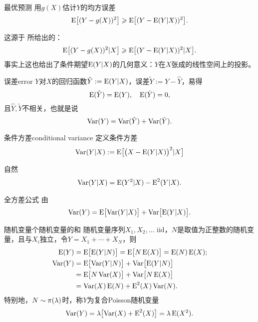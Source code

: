\begin{theorem}{最优预测}{}
	用$g(X)$估计$Y$的均方误差
	\begin{align}
		\E\bigfkh{(Y-g(X))^2}\geqslant\E\bigfkh{(Y-\E(Y|X))^2}.
	\end{align}
\end{theorem}
这源于 所给出的：
\[
	\E\bigfkh{(Y-g(X))^2|X}\geqslant\E\bigfkh{(Y-\E(Y|X))^2|X}.
\]
事实上这也给出了条件期望$\E(Y|X)$的几何意义：$Y$在$X$张成的线性空间上的投影。
\begin{example}{误差}{error}
	$Y$对$X$的回归函数$\hat Y:=\E(Y|X)$，误差$\tilde Y:=Y-\hat Y$，易得
	\[
		\E(\hat Y)=\E(Y),\quad\E(\tilde Y)=0,
	\]
	且$\hat Y,\tilde Y$不相关，也就是说
	\[
		\Var(Y)=\Var(\hat Y)+\Var(\tilde Y).
	\]
	\begin{center}
	\end{center}
\end{example}
\begin{definition}{条件方差}{conditional variance}
	定义条件方差
	\begin{align}
		\Var(Y|X):=\E\bigfkh{\bigkh{X-\E(Y|X)}^2|X}
	\end{align}
\end{definition}
自然
\begin{align}
	\Var(Y|X)=\E(Y^2|X)-\E^2(Y|X).
\end{align}
\begin{theorem}{全方差公式}{}
	由
	\begin{align}
		\Var(Y)=\E\bigfkh{\Var(Y|X)}+\Var\bigfkh{\E(Y|X)}.
	\end{align}
\end{theorem}
\begin{example}{随机变量个随机变量的和}{}
	随机变量序列$X_1,X_2,\ldots$ iid，$N$是取值为正整数的随机变量，且与$X_i$独立，令$Y=X_1+\cdots+X_N$，则
	\begin{align}
		\E(Y)&=\E\bigfkh{\E(Y|N)}=\E\bigfkh{N\E(X)}=\E(N)\E(X);\\\notag
		\Var(Y)&=\E\bigfkh{\Var(Y|N)}+\Var\bigfkh{\E(Y|N)}\\\notag
		&=\E\bigfkh{N\Var(X)}+\Var\bigfkh{N\E(X)}\\
		&=\Var(X)\E(N)+\E^2(X)\Var(N).
	\end{align}
	特别地，$N\sim\Pois(\lambda)$时，称$Y$为复合Poisson随机变量
	\[
		\Var(Y)=\lambda\bigfkh{\Var(X)+\E^2(X)}=\lambda\E(X^2).
	\]
\end{example}